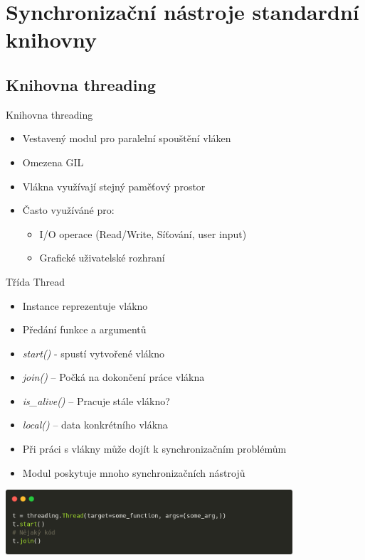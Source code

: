 \documentclass{beamer}
\begin{document}
\section{Synchronizační nástroje standardní knihovny}
\subsection{Knihovna threading}

\begin{frame}{Knihovna threading}
    \begin{itemize}
        \item Vestavený modul pro paralelní spouštění vláken
        \item Omezena GIL
        \item Vlákna využívají stejný paměťový prostor
        \vskip 0.35in
        \item Často využíváné pro:
        \begin{itemize}
            \item I/O operace (Read/Write, Síťování, user input)
            \item Grafické uživatelské rozhraní 
        \end{itemize}
    \end{itemize}
\end{frame}

\begin{frame}[fragile]{Třída Thread}
    \begin{itemize}
        \item Instance reprezentuje vlákno
        \item Předání funkce a argumentů
        \vskip 0.2in

        \item \textit{start()} - spustí vytvořené vlákno
        \item \textit{join()} – Počká na dokončení práce vlákna
        \item \textit{is\_alive()} – Pracuje stále vlákno?
        \item \textit{local()} – data konkrétního vlákna

        \vskip 0.2in
        \item Při práci s vlákny může dojít k synchronizačním problémům
        \item Modul poskytuje mnoho synchronizačních nástrojů
    \end{itemize}
    \scriptsize

    \begin{center}
        \includegraphics[width=0.8\textwidth]{obrazky/codes/carbon1.png}
    \end{center}
\end{frame}
\end{document}
